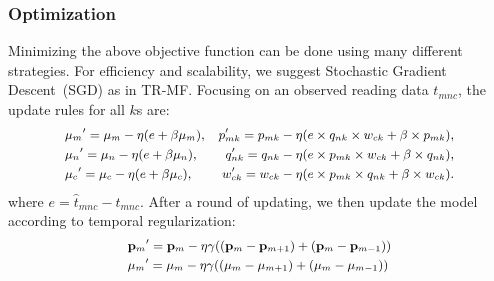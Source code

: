 
\subsubsection{Optimization}
Minimizing the above objective function can be done using many different strategies.
For efficiency and scalability, we suggest Stochastic Gradient Descent~(SGD) as in TR-MF.
Focusing on an observed reading data $t_{mnc} $, the update rules for all $k$s are:
\begin{equation*}
\small
\begin{aligned}
&{\mu_m}^\prime=\mu_m-\eta(e+\beta\mu_m),   &p_{mk}^\prime=p_{mk}-\eta(e\times q_{nk}\times w_{ck} + \beta \times p_{mk}), \\
&{\mu_n}^\prime=\mu_n-\eta(e+\beta\mu_n),   &q_{nk}^\prime=q_{nk}-\eta(e\times p_{mk}\times w_{ck} + \beta \times q_{nk}), \\
&{\mu_c}^\prime=\mu_c-\eta(e+\beta\mu_c),   &w_{ck}^\prime=w_{ck}-\eta(e\times p_{mk}\times q_{nk} + \beta \times w_{ck}). \\
\end{aligned}
\end{equation*}
where $e=\hat{t}_{mnc}-t_{mnc}$. After a round of updating, we then update the model according to temporal regularization:
\begin{equation*}
\small
\begin{aligned}
&{\mathbf{p}_m}^\prime={\mathbf{p}_m}-\eta\gamma((\mathbf{p}_m-\mathbf{p}_{m+1})+(\mathbf{p}_m-\mathbf{p}_{m-1}))
\\&{\mu_m}^\prime=\mu_m-\eta\gamma((\mu_m-\mu_{m+1})+(\mu_m-\mu_{m-1}))
\end{aligned}
\end{equation*}

